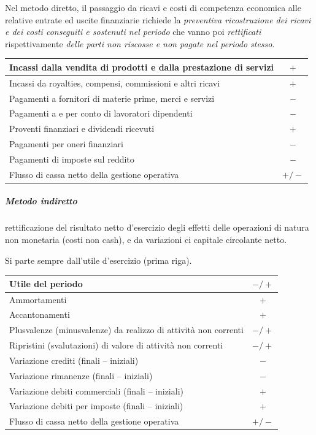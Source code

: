 \documentclass[10pt,a4paper,fleqn,oneside]{book}
\newcommand{\grayrow}{\rowcolor[gray]{.90}}
\begin{document}
Nel metodo diretto, il passaggio da ricavi e costi di competenza economica
alle relative entrate ed uscite finanziarie richiede la
\emph{preventiva ricostruzione dei ricavi e dei costi conseguiti e sostenuti nel periodo}
che vanno poi \emph{rettificati} rispettivamente
\emph{delle parti non riscosse e non pagate nel periodo stesso}.

\vspace{1em}
\begin{tabular}{|l|c|}
    \hline
    Incassi dalla vendita di prodotti e dalla prestazione di servizi & $+$ \\
    \hline
    Incassi da royalties, compensi, commissioni e altri ricavi & $+$ \\
    \hline
    Pagamenti a fornitori di materie prime, merci e servizi & $-$ \\
    \hline
    Pagamenti a e per conto di lavoratori dipendenti & $-$ \\
    \hline
    Proventi finanziari e dividendi ricevuti & $+$ \\
    \hline
    Pagamenti per oneri finanziari & $-$ \\
    \hline
    Pagamenti di imposte sul reddito & $-$ \\
    \hline\grayrow
    Flusso di cassa netto della gestione operativa & $+/-$ \\
    \hline
\end{tabular}

\subparagraph{Metodo indiretto} rettificazione del risultato netto d’esercizio degli effetti
delle operazioni di natura non monetaria (costi non cash), e da variazioni ci
capitale circolante netto.

Si parte sempre dall'utile d'esercizio (prima riga).

\vspace{1em}
\begin{tabular}{|l|c|}
    \hline\grayrow
    Utile del periodo & $-/+$ \\
    \hline
    Ammortamenti & $+$ \\
    \hline
    Accantonamenti & $+$ \\
    \hline
    Plusvalenze (minusvalenze) da realizzo di attività non correnti & $-/+$ \\
    \hline
    Ripristini (svalutazioni) di valore di attività non correnti & $-/+$ \\
    \hline
    Variazione crediti (finali – iniziali) & $-$ \\
    \hline
    Variazione rimanenze (finali – iniziali) & $-$ \\
    \hline
    Variazione debiti commerciali (finali – iniziali) & $+$ \\
    \hline
    Variazione debiti per imposte (finali – iniziali) & $+$ \\
    \hline\grayrow
    Flusso di cassa netto della gestione operativa & $+/-$ \\
    \hline
\end{tabular}
\end{document}
